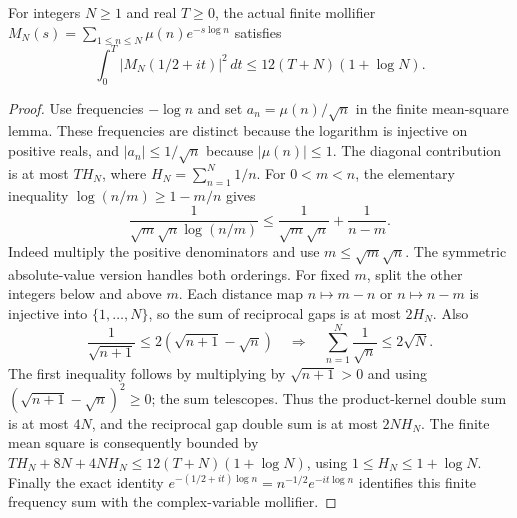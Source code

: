 \begin{lemma}
\label{construction:mollifier-endpoint}
\leanok
For integers $N\ge1$ and real $T\ge0$, the actual finite mollifier
$M_N(s)=\sum_{1\le n\le N}\mu(n)e^{-s\log n}$ satisfies
\[
 \int_0^T|M_N(1/2+it)|^2\,dt
 \le12(T+N)(1+\log N).
\]
\end{lemma}
\begin{proof}
Use frequencies $-\log n$ and set $a_n=\mu(n)/\sqrt n$
in the finite mean-square lemma.
These frequencies are distinct because the logarithm is injective on
positive reals, and $|a_n|\le1/\sqrt n$ because $|\mu(n)|\le1$.
The diagonal contribution is at most $T H_N$, where
$H_N=\sum_{n=1}^N1/n$.
For $0<m<n$, the elementary inequality
$\log(n/m)\ge1-m/n$ gives
\[
 \frac1{\sqrt m\sqrt n\log(n/m)}
 \le\frac1{\sqrt m\sqrt n}+\frac1{n-m}.
\]
Indeed multiply the positive denominators and use
$m\le\sqrt m\sqrt n$.
The symmetric absolute-value version handles both orderings.
For fixed $m$, split the other integers below and above $m$.
Each distance map $n\mapsto m-n$ or $n\mapsto n-m$ is injective into
$\{1,\ldots,N\}$, so the sum of reciprocal gaps is at most $2H_N$.
Also
\[
 \frac1{\sqrt{n+1}}\le2(\sqrt{n+1}-\sqrt n)
 \quad\Longrightarrow\quad
 \sum_{n=1}^N\frac1{\sqrt n}\le2\sqrt N.
\]
The first inequality follows by multiplying by $\sqrt{n+1}>0$ and
using $(\sqrt{n+1}-\sqrt n)^2\ge0$; the sum telescopes.
Thus the product-kernel double sum is at most $4N$, and the reciprocal
gap double sum is at most $2NH_N$.
The finite mean square is consequently bounded by
$TH_N+8N+4NH_N\le12(T+N)(1+\log N)$, using
$1\le H_N\le1+\log N$.
Finally the exact identity
$e^{-(1/2+it)\log n}=n^{-1/2}e^{-it\log n}$ identifies this finite
frequency sum with the complex-variable mollifier.
\end{proof}

